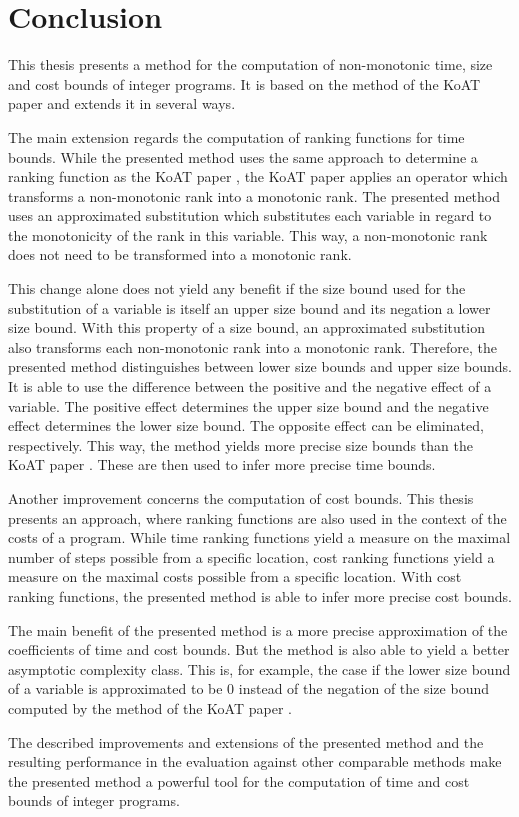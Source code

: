 \section{Conclusion}

This thesis presents a method for the computation of non-monotonic time, size and cost bounds of integer programs.
It is based on the method of the KoAT paper \cite{koat} and extends it in several ways.

The main extension regards the computation of ranking functions for time bounds.
While the presented method uses the same approach to determine a ranking function as the KoAT paper \cite{koat}, the KoAT paper applies an operator which transforms a non-monotonic rank into a monotonic rank.
The presented method uses an approximated substitution which substitutes each variable in regard to the monotonicity of the rank in this variable.
This way, a non-monotonic rank does not need to be transformed into a monotonic rank.

This change alone does not yield any benefit if the size bound used for the substitution of a variable is itself an upper size bound and its negation a lower size bound.
With this property of a size bound, an approximated substitution also transforms each non-monotonic rank into a monotonic rank.
Therefore, the presented method distinguishes between lower size bounds and upper size bounds.
It is able to use the difference between the positive and the negative effect of a variable.
The positive effect determines the upper size bound and the negative effect determines the lower size bound.
The opposite effect can be eliminated, respectively.
This way, the method yields more precise size bounds than the KoAT paper \cite{koat}.
These are then used to infer more precise time bounds.

Another improvement concerns the computation of cost bounds.
This thesis presents an approach, where ranking functions are also used in the context of the costs of a program.
While time ranking functions yield a measure on the maximal number of steps possible from a specific location, cost ranking functions yield a measure on the maximal costs possible from a specific location.
With cost ranking functions, the presented method is able to infer more precise cost bounds.

The main benefit of the presented method is a more precise approximation of the coefficients of time and cost bounds.
But the method is also able to yield a better asymptotic complexity class.
This is, for example, the case if the lower size bound of a variable is approximated to be $0$ instead of the negation of the size bound computed by the method of the KoAT paper \cite{koat}.

The described improvements and extensions of the presented method and the resulting performance in the evaluation against other comparable methods make the presented method a powerful tool for the computation of time and cost bounds of integer programs.
